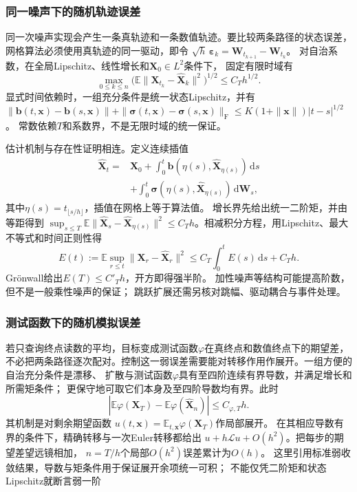 \subsubsection{同一噪声下的随机轨迹误差}
同一次噪声实现会产生一条真轨迹和一条数值轨迹。要比较两条路径的状态误差，网格算法必须使用真轨迹的同一驱动，即令
$\sqrt h\,\bm\varepsilon_k=\bm W_{t_{k+1}}-\bm W_{t_k}$。
对自治系数，在全局Lipschitz、线性增长和$\bm X_0\in L^2$条件下，
固定有限时域有
\[
 \max_{0\leq k\leq n}
   \bigl(\mathbb E\|\bm X_{t_k}-\widehat{\bm X}_k\|^2\bigr)^{1/2}
     \leq C_T h^{1/2}.
\]
显式时间依赖时，一组充分条件是统一状态Lipschitz，并有
$\|\bm b(t,\bm x)-\bm b(s,\bm x)\|
 +\|\bm\sigma(t,\bm x)-\bm\sigma(s,\bm x)\|_{\mathrm F}
 \leq K(1+\|\bm x\|)|t-s|^{1/2}$。
常数依赖$T$和系数界，不是无限时域的统一保证。

估计机制与存在性证明相连。定义连续插值
\[
 \begin{split}
 \widehat{\bm X}_t={}&\bm X_0+
    \int_0^t\bm b(\eta(s),\widehat{\bm X}_{\eta(s)})\,\mathrm ds\\
 &+\int_0^t\bm\sigma(\eta(s),\widehat{\bm X}_{\eta(s)})\,\mathrm d\bm W_s,
 \end{split}
\]
其中$\eta(s)=t_{\lfloor s/h\rfloor}$，插值在网格上等于算法值。
增长界先给出统一二阶矩，并由等距得到
$\sup_{s\leq T}\mathbb E\|\widehat{\bm X}_s-\widehat{\bm X}_{\eta(s)}\|^2
\leq C_T h$。相减积分方程，用Lipschitz、最大不等式和时间正则性得
\[
 E(t):=\mathbb E\sup_{r\leq t}\|\bm X_r-\widehat{\bm X}_r\|^2
       \leq C_T\int_0^tE(s)\,\mathrm ds+C_T h.
\]
Grönwall给出$E(T)\leq C'_T h$，开方即得强半阶。
加性噪声等结构可能提高阶数，但不是一般乘性噪声的保证；
跳跃扩展还需另核对跳幅、驱动耦合与事件处理。

\subsubsection{测试函数下的随机模拟误差}
若只查询终点读数的平均，目标变成测试函数$\varphi$在真终点和数值终点下的期望差，不必把两条路径逐次配对。控制这一弱误差需要能对转移作用作展开。一组方便的自治充分条件是漂移、
扩散与测试函数$\varphi$具有至四阶连续有界导数，并满足增长和所需矩条件；
更保守地可取它们本身及至四阶导数均有界。此时
\[
  |\mathbb E\varphi(\bm X_T)-\mathbb E\varphi(\widehat{\bm X}_n)|
        \leq C_{\varphi,T}h.
\]
其机制是对剩余期望函数
$u(t,\bm x)=\mathbb E_{t,\bm x}\varphi(\bm X_T)$作局部展开。
在其相应导数有界的条件下，精确转移与一次Euler转移都给出
$u+h\mathcal L u+O(h^2)$。把每步的期望差望远镜相加，
$n=T/h$个局部$O(h^2)$误差累计为$O(h)$。
这里引用标准弱收敛结果，导数与矩条件用于保证展开余项统一可积；
不能仅凭二阶矩和状态Lipschitz就断言弱一阶

